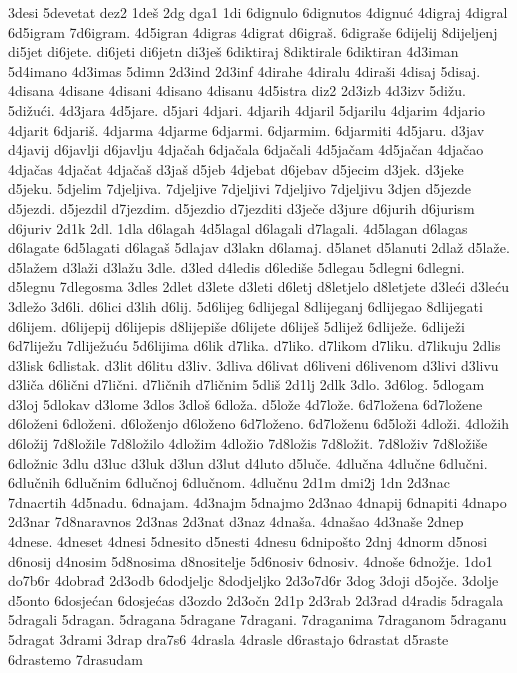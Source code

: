 {3desi
5devetat
dez2
1deš
2dg
dga1
1di
6dignulo
6dignutos
4dignuć
4digraj
4digral
6d5igram
7d6igram.
4d5igran
4digras
4digrat
d6igraš.
6digraše
6dijelij
8dijeljenj
di5jet
di6jete.
di6jeti
di6jetn
di3ješ
6diktiraj
8diktirale
6diktiran
4d3iman
5d4imano
4d3imas
5dimn
2d3ind
2d3inf
4dirahe
4diralu
4diraši
4disaj
5disaj.
4disana
4disane
4disani
4disano
4disanu
4d5istra
diz2
2d3izb
4d3izv
5dižu.
5dižući.
4d3jara
4d5jare.
d5jari
4djari.
4djarih
4djaril
5djarilu
4djarim
4djario
4djarit
6djariš.
4djarma
4djarme
6djarmi.
6djarmim.
6djarmiti
4d5jaru.
d3jav
d4javij
d6javlji
d6javlju
4djačah
6djačala
6djačali
4d5jačam
4d5jačan
4djačao
4djačas
4djačat
4djačaš
d3jaš
d5jeb
4djebat
d6jebav
d5jecim
d3jek.
d3jeke
d5jeku.
5djelim
7djeljiva.
7djeljive
7djeljivi
7djeljivo
7djeljivu
3djen
d5jezde
d5jezdi.
d5jezdil
d7jezdim.
d5jezdio
d7jezditi
d3ječe
d3jure
d6jurih
d6jurism
d6juriv
2d1k
2dl.
1dla
d6lagah
4d5lagal
d6lagali
d7lagali.
4d5lagan
d6lagas
d6lagate
6d5lagati
d6lagaš
5dlajav
d3lakn
d6lamaj.
d5lanet
d5lanuti
2dlaž
d5laže.
d5lažem
d3laži
d3lažu
3dle.
d3led
d4ledis
d6lediše
5dlegau
5dlegni
6dlegni.
d5legnu
7dlegosma
3dles
2dlet
d3lete
d3leti
d6letj
d8letjelo
d8letjete
d3leći
d3leću
3dležo
3d6li.
d6lici
d3lih
d6lij.
5d6lijeg
6dlijegal
8dlijeganj
6dlijegao
8dlijegati
d6lijem.
d6lijepij
d6lijepis
d8lijepiše
d6lijete
d6liješ
5dlijež
6dliježe.
6dliježi
6d7liježu
7dliježuću
5d6lijima
d6lik
d7lika.
d7liko.
d7likom
d7liku.
d7likuju
2dlis
d3lisk
6dlistak.
d3lit
d6litu
d3liv.
3dliva
d6livat
d6liveni
d6livenom
d3livi
d3livu
d3liča
d6lični
d7lični.
d7ličnih
d7ličnim
5dliš
2d1lj
2dlk
3dlo.
3d6log.
5dlogam
d3loj
5dlokav
d3lome
3dlos
3dloš
6dloža.
d5lože
4d7lože.
6d7ložena
6d7ložene
d6loženi
6dloženi.
d6loženjo
d6loženo
6d7loženo.
6d7loženu
6d5loži
4dloži.
4dložih
d6ložij
7d8ložile
7d8ložilo
4dložim
4dložio
7d8ložis
7d8ložit.
7d8loživ
7d8ložiše
6dložnic
3dlu
d3luc
d3luk
d3lun
d3lut
d4luto
d5luče.
4dlučna
4dlučne
6dlučni.
6dlučnih
6dlučnim
6dlučnoj
6dlučnom.
4dlučnu
2d1m
dmi2j
1dn
2d3nac
7dnacrtih
4d5nadu.
6dnajam.
4d3najm
5dnajmo
2d3nao
4dnapij
6dnapiti
4dnapo
2d3nar
7d8naravnos
2d3nas
2d3nat
d3naz
4dnaša.
4dnašao
4d3naše
2dnep
4dnese.
4dneset
4dnesi
5dnesito
d5nesti
4dnesu
6dnipošto
2dnj
4dnorm
d5nosi
d6nosij
d4nosim
5d8nosima
d8nositelje
5d6nosiv
6dnosiv.
4dnoše
6dnožje.
1do1
do7b6r
4dobrađ
2d3odb
6dodjeljc
8dodjeljko
2d3o7d6r
3dog
3doji
d5ojče.
3dolje
d5onto
6dosjećan
6dosjećas
d3ozdo
2d3očn
2d1p
2d3rab
2d3rad
d4radis
5dragala
5dragali
5dragan.
5dragana
5dragane
7dragani.
7draganima
7draganom
5draganu
5dragat
3drami
3drap
dra7s6
4drasla
4drasle
d6rastajo
6drastat
d5raste
6drastemo
7drasudam
}
